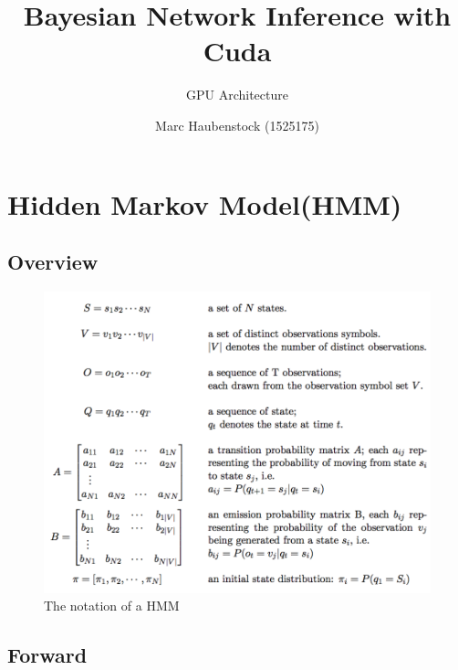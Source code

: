 \documentclass[english, paper=a4]{scrartcl}
\begin{document}
\graphicspath{{images/}}


\title{Bayesian Network Inference with Cuda} 

\subtitle{GPU Architecture} 

\author{Marc Haubenstock (1525175)}




\maketitle

\section{Hidden Markov Model(HMM)}

\subsection{Overview}



\begin{figure}[H]
\centering

\includegraphics[scale=0.4]{"symbols"}
  \caption{The notation of a HMM \cite{cuhmm}}
\end{figure}


\subsection{Forward}
\end{document}
